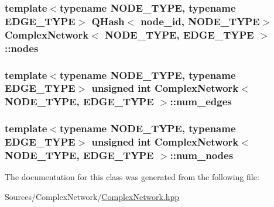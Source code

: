 \hypertarget{class_complex_network_a6b0ecc57af689b9ba9f8855132d1c275}{
\subsubsection[{nodes}]{\setlength{\rightskip}{0pt plus 5cm}template$<$typename N\+O\+D\+E\+\_\+\+T\+Y\+P\+E, typename E\+D\+G\+E\+\_\+\+T\+Y\+P\+E$>$ Q\+Hash$<$ {\bf node\+\_\+id}, N\+O\+D\+E\+\_\+\+T\+Y\+P\+E$>$ {\bf Complex\+Network}$<$ N\+O\+D\+E\+\_\+\+T\+Y\+P\+E, E\+D\+G\+E\+\_\+\+T\+Y\+P\+E $>$\+::nodes\hspace{0.3cm}{\ttfamily [protected]}}}\label{class_complex_network_a6b0ecc57af689b9ba9f8855132d1c275}
\hypertarget{class_complex_network_ac4a7f179af0187eb3071969642b445cc}{
\subsubsection[{num\+\_\+edges}]{\setlength{\rightskip}{0pt plus 5cm}template$<$typename N\+O\+D\+E\+\_\+\+T\+Y\+P\+E, typename E\+D\+G\+E\+\_\+\+T\+Y\+P\+E$>$ unsigned int {\bf Complex\+Network}$<$ N\+O\+D\+E\+\_\+\+T\+Y\+P\+E, E\+D\+G\+E\+\_\+\+T\+Y\+P\+E $>$\+::num\+\_\+edges}}\label{class_complex_network_ac4a7f179af0187eb3071969642b445cc}
\hypertarget{class_complex_network_a6c8777ba48e68c02d2d523abe904b6b1}{
\subsubsection[{num\+\_\+nodes}]{\setlength{\rightskip}{0pt plus 5cm}template$<$typename N\+O\+D\+E\+\_\+\+T\+Y\+P\+E, typename E\+D\+G\+E\+\_\+\+T\+Y\+P\+E$>$ unsigned int {\bf Complex\+Network}$<$ N\+O\+D\+E\+\_\+\+T\+Y\+P\+E, E\+D\+G\+E\+\_\+\+T\+Y\+P\+E $>$\+::num\+\_\+nodes}}\label{class_complex_network_a6c8777ba48e68c02d2d523abe904b6b1}


The documentation for this class was generated from the following file\+:\begin{DoxyCompactItemize}
\item 
Sources/\+Complex\+Network/\hyperlink{_complex_network_8hpp}{Complex\+Network.\+hpp}\end{DoxyCompactItemize}
